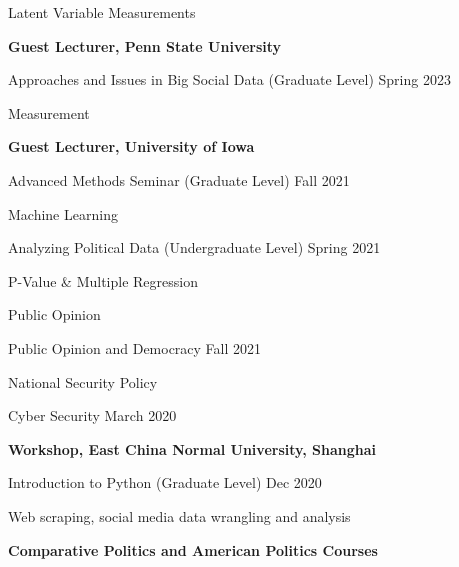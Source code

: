 \documentclass[10.5pt,]{article}
\providecommand{\tightlist}{%
	\setlength{\itemsep}{0pt}\setlength{\parskip}{0pt}}
\renewenvironment{itemize}{
	\begin{list}{}{
			\setlength{\leftmargin}{1.5em}
		}
	}{
	\end{list}
}
\begin{document}
\begin{itemize}
\begin{itemize}
    \begin{itemize}
    \tightlist
    \item
      Latent Variable Measurements
    \end{itemize}
  \item
    \textbf{Guest Lecturer, Penn State University}
  \item
    Approaches and Issues in Big Social Data (Graduate Level)
    \hfill Spring 2023

    \begin{itemize}
    \tightlist
    \item
      Measurement
    \end{itemize}
  \item
    \textbf{Guest Lecturer, University of Iowa}
  \item
    Advanced Methods Seminar (Graduate Level) \hfill Fall 2021

    \begin{itemize}
    \tightlist
    \item
      Machine Learning
    \end{itemize}
  \item
    Analyzing Political Data (Undergraduate Level) \hfill Spring 2021

    \begin{itemize}
    \tightlist
    \item
      P-Value \& Multiple Regression
    \end{itemize}
  \item
    Public Opinion

    \begin{itemize}
    \tightlist
    \item
      Public Opinion and Democracy \hfill Fall 2021
    \end{itemize}
  \item
    National Security Policy

    \begin{itemize}
    \tightlist
    \item
      Cyber Security \hfill March 2020
    \end{itemize}
  \item
    \textbf{Workshop, East China Normal University, Shanghai}
  \item
    Introduction to Python (Graduate Level) \hfill Dec 2020

    \begin{itemize}
    \tightlist
    \item
      Web scraping, social media data wrangling and analysis
    \end{itemize}
  \end{itemize}
\item
  \textbf{Comparative Politics and American Politics Courses}


\end{itemize}
\end{document}
